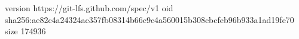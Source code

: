 version https://git-lfs.github.com/spec/v1
oid sha256:ae82c4a24324ac357fb08314b66c9c4a560015b308cbcfeb96b933a1ad19fe70
size 174936
